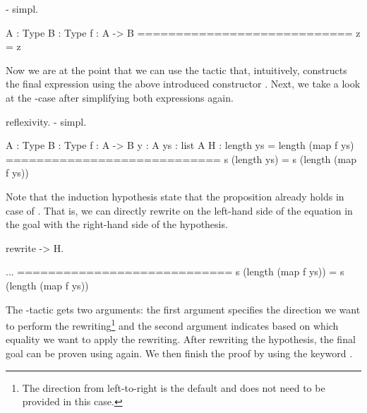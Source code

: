\begin{cproof}
\begin{miniMinted}
- simpl.
\end{miniMinted}
\begin{miniVerb}
  A : Type
  B : Type
  f : A -> B
  ============================
  z = z
\end{miniVerb}
\end{cproof}

Now we are at the point that we can use the tactic  that, intuitively, constructs the final expression using the above introduced constructor .
Next, we take a look at the -case after simplifying both expressions again.

\begin{cproof}
\begin{miniMinted}
    reflexivity.
  - simpl.
\end{miniMinted}
\begin{miniVerb}
  A : Type
  B : Type
  f : A -> B
  y : A
  ys : list A
  H : length ys = length (map f ys)
  ============================
  s (length ys) = s (length (map f ys))
\end{miniVerb}
\end{cproof}

Note that the induction hypothesis  state that the proposition already holds in case of .
That is, we can directly rewrite  on the left-hand side of the equation in the goal with the right-hand side of the hypothesis.

\begin{cproof}
\begin{miniMinted}
rewrite -> H.
\end{miniMinted}
\begin{miniVerb}
  ...
  ============================
  s (length (map f ys)) =
  s (length (map f ys))
\end{miniVerb}
\end{cproof}

The -tactic gets two arguments: the first argument specifies the direction we want to perform the rewriting\footnote{The direction from left-to-right is the default and does not need to be provided in this case.} and the second argument indicates based on which equality we want to apply the rewriting.
After rewriting the hypothesis, the final goal can be proven using  again.
We then finish the proof by using the keyword .

